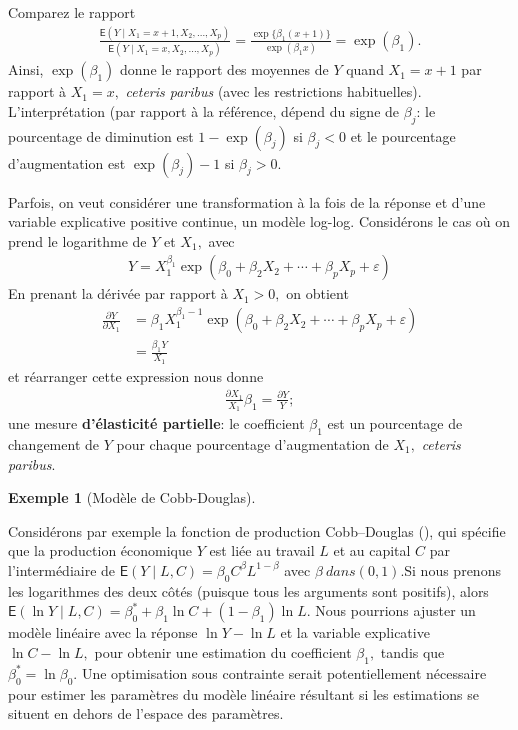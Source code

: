 \documentclass[
  11pt,
  letterpaper,
]{scrbook}
\theoremstyle{plain}
\theoremstyle{plain}
\theoremstyle{definition}
\newtheorem{example}{Exemple}[chapter]
\theoremstyle{definition}
\theoremstyle{remark}
\begin{document}
Comparez le rapport \begin{align*}
\frac{\mathsf{E}(Y \mid X_1=x+1, X_2, \ldots, X_p)}{\mathsf{E}(Y \mid X_1=x,  X_2, \ldots, X_p)} = \frac{\exp\{\beta_1(x+1)\}}{\exp(\beta_1 x)} = \exp(\beta_1).
\end{align*} Ainsi, \(\exp(\beta_1)\) donne le rapport des moyennes de
\(Y\) quand \(X_1=x+1\) par rapport à \(X_1=x,\) \emph{ceteris paribus}
(avec les restrictions habituelles). L'interprétation (par rapport à la
référence, dépend du signe de \(\beta_j\): le pourcentage de diminution
est \(1-\exp(\beta_j)\) si \(\beta_j <0\) et le pourcentage
d'augmentation est \(\exp(\beta_j)-1\) si \(\beta_j>0.\)

Parfois, on veut considérer une transformation à la fois de la réponse
et d'une variable explicative positive continue, un modèle log-log.
Considérons le cas où on prend le logarithme de \(Y\) et \(X_1,\) avec
\begin{align*}
Y= X_1^{\beta_1}\exp(\beta_0 + \beta_2X_2 + \cdots + \beta_pX_p + \varepsilon)
\end{align*} En prenant la dérivée par rapport à \(X_1>0,\) on obtient
\begin{align*}
\frac{\partial Y}{\partial X_1}&= \beta_1 X_1^{\beta_1-1}\exp(\beta_0 + \beta_2X_2 + \cdots + \beta_pX_p + \varepsilon)\\&= \frac{\beta_1 Y}{X_1}
\end{align*} et réarranger cette expression nous donne \begin{align*}
\frac{\partial X_1}{X_1}\beta_1 = \frac{\partial Y}{Y};
\end{align*} une mesure \textbf{d'élasticité partielle}: le coefficient
\(\beta_1\) est un pourcentage de changement de \(Y\) pour chaque
pourcentage d'augmentation de \(X_1,\) \emph{ceteris paribus}.

\begin{example}[Modèle de
Cobb-Douglas]\protect\hypertarget{exm-loglog}{}\label{exm-loglog}

Considérons par exemple la fonction de production Cobb--Douglas
(), qui spécifie que la
production économique \(Y\) est liée au travail \(L\) et au capital
\(C\) par l'intermédiaire de
\(\mathsf{E}(Y \mid L, C) = \beta_0C^{\beta}L^{1-\beta}\) avec
\(\beta \ dans (0,1).\)Si nous prenons les logarithmes des deux côtés
(puisque tous les arguments sont positifs), alors
\(\mathsf{E}(\ln Y \mid L, C) = \beta_0^* + \beta_1 \ln C + (1-\beta_1)\ln L.\)
Nous pourrions ajuster un modèle linéaire avec la réponse
\(\ln Y - \ln L\) et la variable explicative \(\ln C - \ln L,\) pour
obtenir une estimation du coefficient \(\beta_1,\) tandis que
\(\beta_0^*=\ln \beta_0.\) Une optimisation sous contrainte serait
potentiellement nécessaire pour estimer les paramètres du modèle
linéaire résultant si les estimations se situent en dehors de l'espace
des paramètres.

\end{example}
\end{document}
